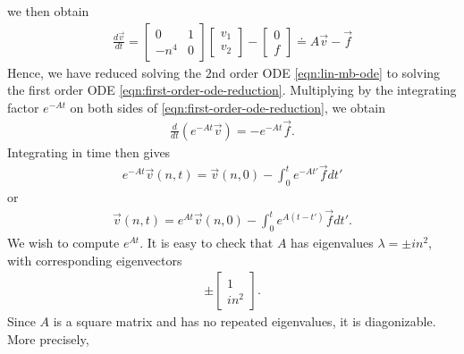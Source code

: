 \documentclass[12pt,reqno]{amsart}
\numberwithin{equation}{section}  %
\numberwithin{figure}{section}
\theoremstyle{plain}
\theoremstyle{definition}
\theoremstyle{remark}
\begin{document}
%
%
we then obtain
%
%
\begin{equation}
\begin{split}
\frac{d \vec v}{dt} = 
\begin{bmatrix}
0 & 1 \\
-n^{4} & 0
\end{bmatrix}
\begin{bmatrix}
  v_{1}\\
  v_{2}
\end{bmatrix}
-
\begin{bmatrix}
0\\
f
\end{bmatrix}
\doteq A \vec v - \vec f
\end{split}
\label{eqn:first-order-ode-reduction}
\end{equation}
%
%
Hence, we have reduced solving the $2$nd order ODE \eqref{eqn:lin-mb-ode} to
solving the first order ODE \eqref{eqn:first-order-ode-reduction}. Multiplying
by the integrating factor $e^{-At}$ on both sides of
\eqref{eqn:first-order-ode-reduction}, we obtain
%
%
\begin{equation*}
\begin{split}
  \frac{d}{dt}(e^{-At} \vec v) = -e^{-At} \vec f.
\end{split}
\end{equation*}
%
%
Integrating in time then gives
%
%
\begin{equation*}
\begin{split}
  e^{-At} \vec v(n, t) = \vec v(n, 0) - \int_{0}^{t}e^{-At'} \vec f dt'
\end{split}
\end{equation*}
%
%
or
%
%
\begin{equation}
  \label{ode-vec-soln}
\begin{split}
  \vec v(n, t) = e^{At} \vec v(n, 0) - \int_{0}^{t}e^{A(t - t')} \vec f dt'.
\end{split}
\end{equation}
%
%
We wish to compute $e^{At}$. It is easy to check that $A$ has eigenvalues
$\lambda = \pm in^{2}$, with corresponding eigenvectors 
%
%
\begin{equation*}
\begin{split}
\pm \begin{bmatrix}
1 \\
in^{2}
\end{bmatrix}.
\end{split}
\end{equation*}
%
%
Since $A$ is a square matrix and has no repeated
eigenvalues, it is diagonizable. More precisely,
\end{document}
